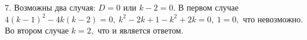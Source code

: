 7. Возможны два случая: $D=0$ или $k-2=0.$ В первом случае $4(k-1)^2-4k(k-2)=0,\ k^2-2k+1-k^2+2k=0,\ 1=0,$ что невозможно. Во втором случае $k=2,$ что и является ответом.\\
